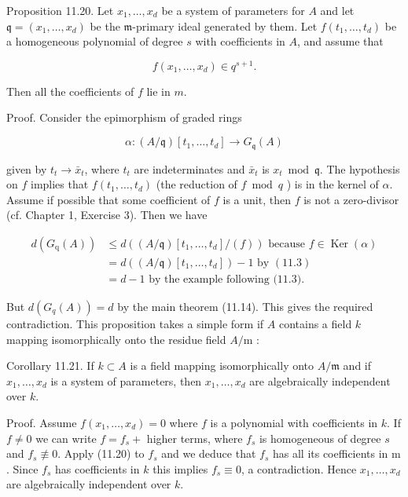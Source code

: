 \documentclass{standalone}
\theoremstyle{definition}
\theoremstyle{remark}
\begin{document}
Proposition 11.20. Let $x_{1}, \ldots, x_{d}$ be a system of parameters for $A$ and let $\mathfrak{q}=\left(x_{1}, \ldots, x_{d}\right)$ be the $\mathfrak{m}$-primary ideal generated by them. Let $f\left(t_{1}, \ldots, t_{d}\right)$ be a homogeneous polynomial of degree $s$ with coefficients in $A$, and assume that

\[
f\left(x_{1}, \ldots, x_{d}\right) \in q^{s+1} .
\]

Then all the coefficients of $f$ lie in $m$.

Proof. Consider the epimorphism of graded rings

\[
\alpha:(A / \mathfrak{q})\left[t_{1}, \ldots, t_{d}\right] \rightarrow G_{\mathfrak{q}}(A)
\]

given by $t_{t} \rightarrow \bar{x}_{t}$, where $t_{t}$ are indeterminates and $\bar{x}_{t}$ is $x_{t} \bmod \mathfrak{q}$. The hypothesis on $f$ implies that $f\left(t_{1}, \ldots, t_{d}\right)$ (the reduction of $f \bmod q$ ) is in the kernel of $\alpha$. Assume if possible that some coefficient of $f$ is a unit, then $f$ is not a zero-divisor (cf. Chapter 1, Exercise 3). Then we have

\[
\begin{aligned}
d\left(G_{\mathrm{q}}(A)\right) & \leqslant d\left((A / \mathfrak{q})\left[t_{1}, \ldots, t_{d}\right] /(f)\right) \text { because } f \in \operatorname{Ker}(\alpha) \\
& =d\left((A / \mathfrak{q})\left[t_{1}, \ldots, t_{d}\right]\right)-1 \text { by }(11.3) \\
& =d-1 \text { by the example following (11.3). }
\end{aligned}
\]

But $d\left(G_{q}(A)\right)=d$ by the main theorem (11.14). This gives the required contradiction. This proposition takes a simple form if $A$ contains a field $k$ mapping isomorphically onto the residue field $A / \mathrm{m}$ :

Corollary 11.21. If $k \subset A$ is a field mapping isomorphically onto $A / \mathfrak{m}$ and if $x_{1}, \ldots, x_{d}$ is a system of parameters, then $x_{1}, \ldots, x_{d}$ are algebraically independent over $k$.

Proof. Assume $f\left(x_{1}, \ldots, x_{d}\right)=0$ where $f$ is a polynomial with coefficients in $k$. If $f \neq 0$ we can write $f=f_{s}+$ higher terms, where $f_{s}$ is homogeneous of degree $s$ and $f_{s} \not \equiv 0$. Apply (11.20) to $f_{s}$ and we deduce that $f_{s}$ has all its coefficients in $\mathrm{m}$. Since $f_{s}$ has coefficients in $k$ this implies $f_{s} \equiv 0$, a contradiction. Hence $x_{1}, \ldots, x_{d}$ are algebraically independent over $k$.
\end{document}
